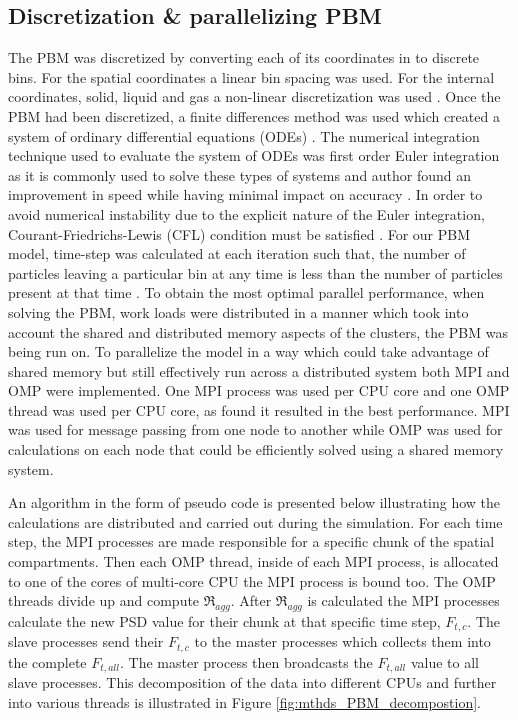\documentclass[preprint,11pt,authoryear]{elsarticle}
\begin{document}
\subsection{Discretization \& parallelizing PBM}
The PBM was discretized by converting each of its coordinates in to discrete bins. For the spatial 
coordinates a linear bin spacing was used. For the internal coordinates, solid, liquid and gas a 
non-linear discretization was used \citep{barrasso2012}. 
Once the PBM had been discretized, a finite differences method was 
used which created a system of ordinary differential equations (ODEs) \citep{Barrasso2015cerd}. The 
numerical integration technique used to evaluate the system of ODEs was first order Euler integration 
as it is commonly used to solve these types of systems and author found an improvement in  speed while
having minimal impact on accuracy \citep{Barrasso2013}. In order to avoid numerical instability due 
to the explicit nature of the Euler integration, Courant-Friedrichs-Lewis (CFL) condition must be 
satisfied \citep{courant1967}. For our PBM model, time-step was calculated at each iteration such 
that, the number of particles leaving a particular bin at any time is less than the number of 
particles present at that time \citep{Ramachandran2010}. To obtain the most optimal parallel 
performance, when solving the PBM, work loads were distributed in a manner which took into account 
the shared and distributed memory aspects of the clusters, the PBM was being run on. To 
parallelize the model in a way which could take advantage of shared memory but still effectively run 
across a distributed system both MPI and OMP were implemented. One MPI process was used per CPU core and one OMP 
thread was used per CPU core, as \cite{Bettencourt2017} found it resulted in the best performance. 
MPI was used for message passing from one node to another while OMP was used for calculations on each 
node that could be efficiently solved using a shared memory system. 

An algorithm in the form of pseudo code is presented below illustrating how the calculations are distributed and 
carried out 
during the simulation. For each time step, the MPI processes are made responsible for a specific chunk 
of the spatial compartments. Then each OMP thread, inside of each MPI process, is allocated to one of 
the cores of multi-core CPU the MPI process is bound too. The OMP threads divide up and 
compute $\Re_{agg}$. After $\Re_{agg}$ is calculated the MPI 
processes calculate the new PSD value for their chunk at that specific time step, $F_{t,c}$. The slave 
processes send their $F_{t,c}$ to the master processes which collects them into the complete 
$F_{t,all}$. The master process then broadcasts the $F_{t,all}$ value to all slave processes. This 
decomposition of the data into different CPUs and further into various threads is illustrated in Figure 
\ref{fig:mthds_PBM_decompostion}.	
\end{document}
